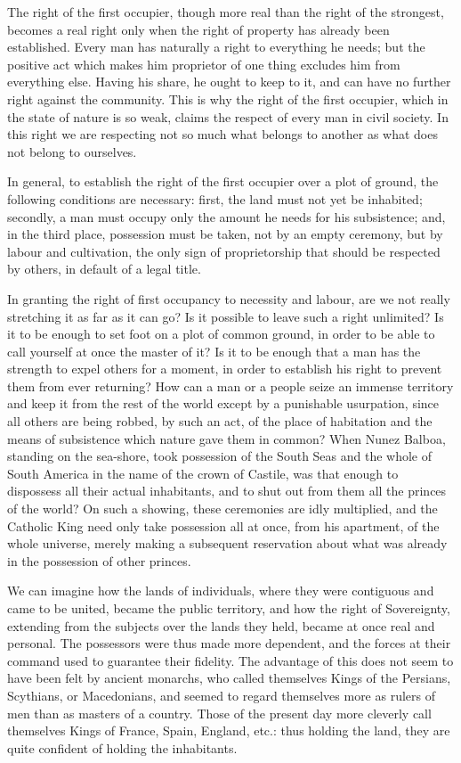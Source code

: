 \documentclass[12pt]{report}
\begin{document}
The right of the first occupier, though more real than the right of the strongest, becomes a real right only when the right of property has already been established. Every man has naturally a right to everything he needs; but the positive act which makes him proprietor of one thing excludes him from everything else. Having his share, he ought to keep to it, and can have no further right against the community. This is why the right of the first occupier, which in the state of nature is so weak, claims the respect of every man in civil society. In this right we are respecting not so much what belongs to another as what does not belong to ourselves.

In general, to establish the right of the first occupier over a plot of ground, the following conditions are necessary: first, the land must not yet be inhabited; secondly, a man must occupy only the amount he needs for his subsistence; and, in the third place, possession must be taken, not by an empty ceremony, but by labour and cultivation, the only sign of proprietorship that should be respected by others, in default of a legal title.

In granting the right of first occupancy to necessity and labour, are we not really stretching it as far as it can go? Is it possible to leave such a right unlimited? Is it to be enough to set foot on a plot of common ground, in order to be able to call yourself at once the master of it? Is it to be enough that a man has the strength to expel others for a moment, in order to establish his right to prevent them from ever returning? How can a man or a people seize an immense territory and keep it from the rest of the world except by a punishable usurpation, since all others are being robbed, by such an act, of the place of habitation and the means of subsistence which nature gave them in common? When Nunez Balboa, standing on the sea-shore, took possession of the South Seas and the whole of South America in the name of the crown of Castile, was that enough to dispossess all their actual inhabitants, and to shut out from them all the princes of the world? On such a showing, these ceremonies are idly multiplied, and the Catholic King need only take possession all at once, from his apartment, of the whole universe, merely making a subsequent reservation about what was already in the possession of other princes.

We can imagine how the lands of individuals, where they were contiguous and came to be united, became the public territory, and how the right of Sovereignty, extending from the subjects over the lands they held, became at once real and personal. The possessors were thus made more dependent, and the forces at their command used to guarantee their fidelity. The advantage of this does not seem to have been felt by ancient monarchs, who called themselves Kings of the Persians, Scythians, or Macedonians, and seemed to regard themselves more as rulers of men than as masters of a country. Those of the present day more cleverly call themselves Kings of France, Spain, England, etc.: thus holding the land, they are quite confident of holding the inhabitants.
\end{document}
